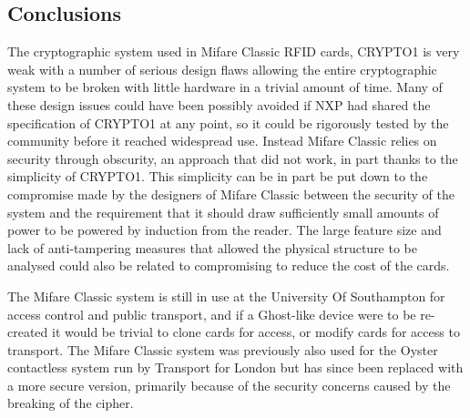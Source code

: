 \documentclass[pdflatex, a4paper,12pt]{article}
\begin{document}
\subsection{Conclusions}

The cryptographic system used in Mifare Classic RFID cards, CRYPTO1 is very
weak with a number of serious design flaws allowing the entire cryptographic
system to be broken with little hardware in a trivial amount of time. Many of
these design issues could have been possibly avoided if NXP had shared the specification of
CRYPTO1 at any point, so it could be rigorously tested by the community before
it reached widespread use. Instead Mifare Classic relies on security through
obscurity, an approach that did not work, in part thanks to the simplicity of
CRYPTO1. This simplicity can be in part be put down to the compromise made by
the designers of Mifare Classic between the security of the system and the
requirement that it should draw sufficiently small amounts of power to be
powered by induction from the reader. The large feature size and lack of
anti-tampering measures that allowed the
physical structure to be analysed could also be related to compromising to
reduce the cost of the cards.

The Mifare Classic system is still in use at the University Of Southampton for
access control and public transport, and if a Ghost-like device were to be
re-created it would be trivial to clone cards for access, or modify cards for
access to transport. The Mifare Classic system was previously also used for the
Oyster contactless system run by Transport for London but has since been replaced
with a more secure version, primarily because of the security concerns caused by
the breaking of the cipher.


{}
\end{document}
